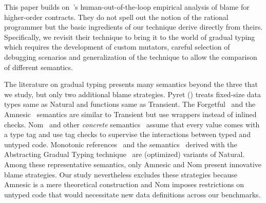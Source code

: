 This paper builds on~\citet{lksfd-popl-2020}'s human-out-of-the-loop
empirical analysis of
blame for higher-order contracts. They do not spell out the notion of the
rational programmer but the basic ingredients of our technique derive
directly from theirs. Specifically, we revisit their  technique
to bring it to the world of gradual typing which requires the development of custom mutators,
careful selection of debugging scenarios and generalization of the
technique to allow the comparison of different semantics.

The literature on gradual typing presents many semantics beyond the three
that we study, but only two additional blame strategies.
Pyret () treats fixed-size data types same as Natural
and functions same as Transient. The Forgetful~\cite{cl-icfp-2017} and
the Amnesic~\cite{gfd-oopsla-2019} semantics are similar to Transient but
use wrappers instead of inlined checks.  Nom~\cite{mt-oopsla-2017} and
other \emph{concrete\/} semantics~\cite{wnlov-popl-2010, rsfbv-popl-2015,
rzv-ecoop-2015, rat-oopsla-2017} assume that every value comes with a type tag
and use tag checks to supervise the interactions between typed and untyped code.
Monotonic
references~\cite{svctg-esop-2015} and the semantics~\cite{tlt-popl-2019,
etg-icfp-19, tt-scp-20, tgt-popl-18, tt-sas-17} derived with the
Abstracting Gradual Typing
technique~\cite{gct-popl-2016} are (optimized) variants of Natural.
Among these representative semantics, only Amnesic and Nom present innovative
blame strategies.
Our study nevertheless excludes these strategies because Amnesic is a mere
theoretical construction and Nom imposes restrictions on untyped
code that would necessitate new data definitions across our benchmarks.
 
